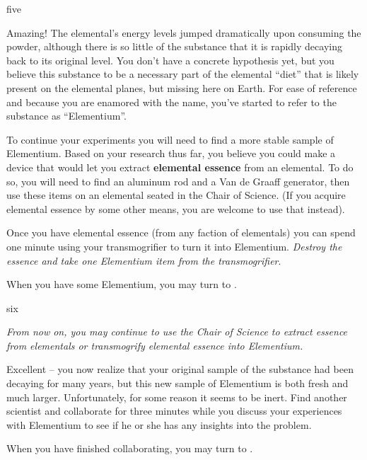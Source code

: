 \documentclass[notebook]{elementals}
\begin{document}
\begin{page}{five}

Amazing! The elemental's energy levels jumped dramatically upon consuming the powder, although there is so little of the substance that it is rapidly decaying back to its original level. You don't have a concrete hypothesis yet, but you believe this substance to be a necessary part of the elemental ``diet'' that is likely present on the elemental planes, but missing here on Earth. For ease of reference and because you are enamored with the name, you've started to refer to the substance as ``Elementium''.

To continue your experiments you will need to find a more stable sample of Elementium. Based on your research thus far, you believe you could make a device that would let you extract \textbf{elemental essence} from an elemental. To do so, you will need to find an aluminum rod and a Van de Graaff generator, then use these items on an elemental seated in the Chair of Science. (If you acquire elemental essence by some other means, you are welcome to use that instead).

Once you have elemental essence (from any faction of elementals) you can spend one minute using your transmogrifier to turn it into Elementium. \emph{Destroy the essence and take one Elementium item from the transmogrifier}.

When you have some Elementium, you may turn to .

\end{page}

\begin{page}{six}

\emph{From now on, you may continue to use the Chair of Science to extract essence from elementals or transmogrify elemental essence into Elementium.}

Excellent -- you now realize that your original sample of the substance had been decaying for many years, but this new sample of Elementium is both fresh and much larger. Unfortunately, for some reason it seems to be inert. Find another scientist and collaborate for three minutes while you discuss your experiences with Elementium to see if he or she has any insights into the problem.

When you have finished collaborating, you may turn to .

\end{page}
\end{document}

